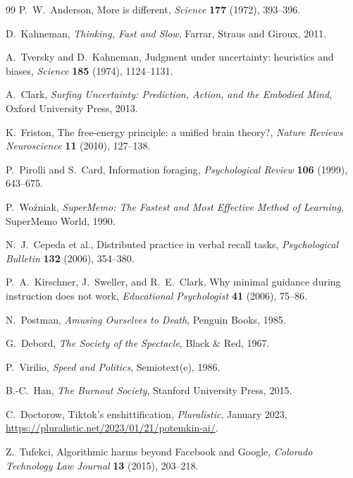 \documentclass{amsart}
\theoremstyle{plain}
\theoremstyle{definition}
\theoremstyle{remark}
\begin{document}
\begin{thebibliography}{99}
  P.\ W.\ Anderson,
  More is different,
  \textit{Science} \textbf{177} (1972), 393--396.

  D.\ Kahneman,
  \textit{Thinking, Fast and Slow},
  Farrar, Straus and Giroux, 2011.

  A.\ Tversky and D.\ Kahneman,
  Judgment under uncertainty: heuristics and biases,
  \textit{Science} \textbf{185} (1974), 1124--1131.

  A.\ Clark,
  \textit{Surfing Uncertainty: Prediction, Action, and the Embodied Mind},
  Oxford University Press, 2013.

  K.\ Friston,
  The free-energy principle: a unified brain theory?,
  \textit{Nature Reviews Neuroscience} \textbf{11} (2010), 127--138.

  P.\ Pirolli and S.\ Card,
  Information foraging,
  \textit{Psychological Review} \textbf{106} (1999), 643--675.

  P.\ Wo\'zniak,
  \textit{SuperMemo: The Fastest and Most Effective Method of Learning},
  SuperMemo World, 1990.

  N.\ J.\ Cepeda et al.,
  Distributed practice in verbal recall tasks,
  \textit{Psychological Bulletin} \textbf{132} (2006), 354--380.

  P.\ A.\ Kirschner, J.\ Sweller, and R.\ E.\ Clark,
  Why minimal guidance during instruction does not work,
  \textit{Educational Psychologist} \textbf{41} (2006), 75--86.

  N.\ Postman,
  \textit{Amusing Ourselves to Death},
  Penguin Books, 1985.

  G.\ Debord,
  \textit{The Society of the Spectacle},
  Black \& Red, 1967.

  P.\ Virilio,
  \textit{Speed and Politics},
  Semiotext(e), 1986.

  B.-C.\ Han,
  \textit{The Burnout Society},
  Stanford University Press, 2015.

  C.\ Doctorow,
  Tiktok's enshittification,
  \textit{Pluralistic}, January 2023,
  \url{https://pluralistic.net/2023/01/21/potemkin-ai/}.

  Z.\ Tufekci,
  Algorithmic harms beyond Facebook and Google,
  \textit{Colorado Technology Law Journal} \textbf{13} (2015), 203--218.


\end{thebibliography}
\end{document}
